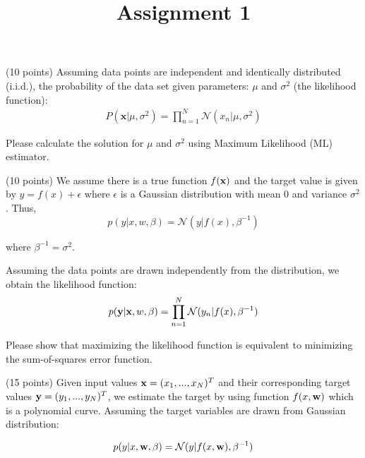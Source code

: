 \documentclass{exam}
\title{Assignment 1}
\date{}
\newcommand{\xx}{{\bf{x}}}
\newcommand{\yy}{{\bf{y}}}
\newcommand{\ww}{{\bf{w}}}
\begin{document}
\maketitle
\thispagestyle{headandfoot}

\begin{center}
  {}
\end{center}
\vspace{.5cm}
\begin{questions}

 (10 points) Assuming data points are independent and identically distributed (i.i.d.), the probability of the data set given parameters: $\mu$ and $\sigma^2$ (the likelihood function):
\begin{align}
\nonumber P(\mathbf{x}|\mu,\sigma^2) = \prod_{n=1}^N\mathcal{N}(x_n|\mu,\sigma^2)
\end{align}

Please calculate the solution for $\mu$ and $\sigma^2$ using Maximum Likelihood (ML) estimator.


\newpage
{} (10 points) We assume there is a true function $f(\xx)$ and the target value is given by $y=f(x)+\epsilon$ where $\epsilon$ is a Gaussian distribution with mean $0$ and variance $\sigma^2$.
Thus,
$$p(y|x,w,\beta) =\mathcal{N}(y| f(x), \beta^{-1})$$

where $\beta^{-1} = \sigma^2$.

Assuming the data points are drawn independently from the distribution, we obtain the likelihood function:
$$p(\mathbf{y}|\xx,w,\beta) = \prod_{n=1}^N \mathcal{N}(y_n|f(x),\beta^{-1})$$

Please show that maximizing the likelihood function is equivalent to minimizing the sum-of-squares error function.


\newpage
{} (15 points) Given input values $\xx= (x_1,...,x_N)^T$ and their corresponding target values $\yy= (y_1,...,y_N)^T$, we estimate the target by using function $f(x,\ww)$ which is a polynomial curve. Assuming the target variables are drawn from Gaussian distribution:

$$p(y|x, \ww,\beta) = \mathcal{N} (y | f(x,\ww), \beta^{-1})$$


\end{questions}
\end{document}
